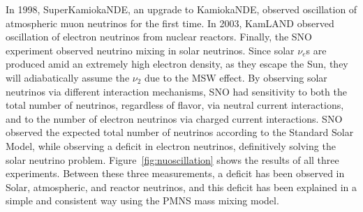 \documentclass[/main.tex]{subfiles}
\begin{document}
  In 1998, SuperKamiokaNDE, an upgrade to KamiokaNDE, observed oscillation of atmospheric muon neutrinos for the first time\cite{superk1998}.
In 2003, KamLAND observed oscillation of electron neutrinos from nuclear reactors\cite{kamland2003}.
Finally, the SNO experiment observed neutrino mixing in solar neutrinos.
Since solar $\nu_e$s are produced amid an extremely high electron density, as they escape the Sun, they will adiabatically assume the $\nu_2$ due to the MSW effect.
By observing solar neutrinos via different interaction mechanisms, SNO had sensitivity to both the total number of neutrinos, regardless of flavor, via neutral current interactions, and to the number of electron neutrinos via charged current interactions.
SNO observed the expected total number of neutrinos according to the Standard Solar Model, while observing a deficit in electron neutrinos, definitively solving the solar neutrino problem\cite{SNO2002}.
Figure~\ref{fig:nuoscillation} shows the results of all three experiments.
Between these three measurements, a deficit has been observed in Solar, atmospheric, and reactor neutrinos, and this deficit has been explained in a simple and consistent way using the PMNS mass mixing model.
\end{document}
